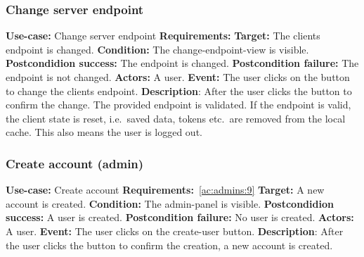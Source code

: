 \subsubsection{Change server endpoint}\label{subsubsec:change-server-endpoint}
\textbf{Use-case:} Change server endpoint \newline
\textbf{Requirements:} \newline
\textbf{Target:} The clients endpoint is changed. \newline
\textbf{Condition:} The change-endpoint-view is visible. \newline
\textbf{Postcondidion success:} The endpoint is changed. \newline
\textbf{Postcondition failure:} The endpoint is not changed. \newline
\textbf{Actors:} A user. \newline
\textbf{Event:} The user clicks on the button to change the clients endpoint. \newline
\textbf{Description}: After the user clicks the button to confirm the change.
The provided endpoint is validated.
If the endpoint is valid, the client state is reset, i.e.\ saved data, tokens etc.\ are removed from the local cache.
This also means the user is logged out.

\subsubsection{Create account (admin)}\label{subsubsec:create-user}
\textbf{Use-case:} Create account \newline
\textbf{Requirements:}~\ref{ac:admins:9} \newline
\textbf{Target:} A new account is created. \newline
\textbf{Condition:} The admin-panel is visible. \newline
\textbf{Postcondidion success:} A user is created. \newline
\textbf{Postcondition failure:} No user is created. \newline
\textbf{Actors:} A user. \newline
\textbf{Event:} The user clicks on the create-user button. \newline
\textbf{Description}: After the user clicks the button to confirm the creation, a new account is created.

